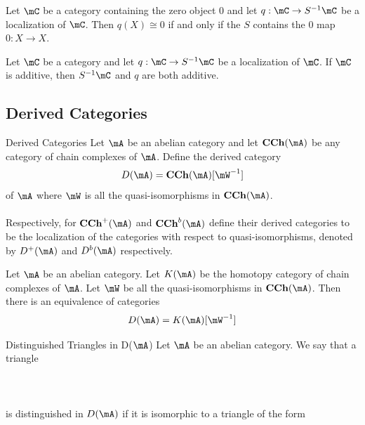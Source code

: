 \documentclass[a4paper]{article}
\begin{document}
\begin{crl}{}{} Let $\mC$ be a category containing the zero object $0$ and let $q:\mC\to S^{-1}\mC$ be a localization of $\mC$. Then $q(X)\cong 0$ if and only if the $S$ contains the $0$ map $0:X\to X$. 
\end{crl}

\begin{crl}{}{} Let $\mC$ be a category and let $q:\mC\to S^{-1}\mC$ be a localization of $\mC$. If $\mC$ is additive, then $S^{-1}\mC$ and $q$ are both additive. 
\end{crl}

\subsection{Derived Categories}
\begin{defn}{Derived Categories}{} Let $\mA$ be an abelian category and let $\bold{CCh}(\mA)$ be any category of chain complexes of $\mA$. Define the derived category $$D(\mA)=\bold{CCh}(\mA)[\mW^{-1}]$$ of $\mA$ where $\mW$ is all the quasi-isomorphisms in $\bold{CCh}(\mA)$. \\~\\

Respectively, for $\bold{CCh}^+(\mA)$ and $\bold{CCh}^b(\mA)$ define their derived categories to be the localization of the categories with respect to quasi-isomorphisms, denoted by $D^+(\mA)$ and $D^b(\mA)$ respectively. 
\end{defn}

\begin{thm}{}{} Let $\mA$ be an abelian category. Let $K(\mA)$ be the homotopy category of chain complexes of $\mA$. Let $\mW$ be all the quasi-isomorphisms in $\bold{CCh}(\mA)$. Then there is an equivalence of categories $$D(\mA)=K(\mA)[\mW^{-1}]$$
\end{thm}

\begin{defn}{Distinguished Triangles in D($\mA$)}{} Let $\mA$ be an abelian category. We say that a triangle \\~\\
\\~\\
is distinguished in $D(\mA)$ if it is isomorphic to a triangle of the form \\~\\
\end{defn}
\end{document}
